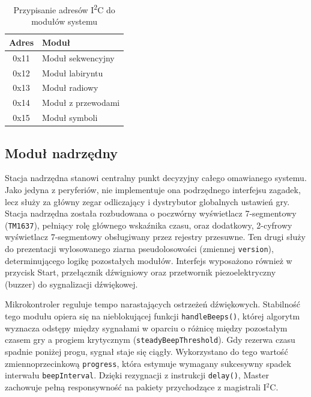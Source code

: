 \documentclass{SGGW-thesis}
\begin{document}
\begin{table}[H]
\centering
\caption{Przypisanie adresów I\textsuperscript{2}C do modułów systemu} \label{tab:module_i2c_addresses}
\begin{tabular}{|c|l|}
\hline
\textbf{Adres} & \textbf{Moduł} \\
\hline
0x11 & Moduł sekwencyjny \\
\hline
0x12 & Moduł labiryntu \\
\hline
0x13 & Moduł radiowy \\
\hline
0x14 & Moduł z przewodami \\
\hline
0x15 & Moduł symboli \\
\hline
\end{tabular}
\end{table}

\subsection{Moduł nadrzędny}
Stacja nadrzędna stanowi centralny punkt decyzyjny całego omawianego systemu. Jako jedyna z peryferiów, nie implementuje ona podrzędnego interfejsu zagadek, lecz służy za główny zegar odliczający i dystrybutor globalnych ustawień gry. Stacja nadrzędna została rozbudowana o poczwórny wyświetlacz 7-segmentowy (\texttt{TM1637}), pełniący rolę głównego wskaźnika czasu, oraz dodatkowy, 2-cyfrowy wyświetlacz 7-segmentowy obsługiwany przez rejestry przesuwne. Ten drugi służy do prezentacji wylosowanego ziarna pseudolosowości (zmiennej \texttt{version}), determinującego logikę pozostałych modułów. Interfejs wyposażono również w przycisk Start, przełącznik dźwigniowy oraz przetwornik piezoelektryczny (buzzer) do sygnalizacji dźwiękowej.

Mikrokontroler reguluje tempo narastających ostrzeżeń dźwiękowych. Stabilność tego modułu opiera się na nieblokującej funkcji \texttt{handleBeeps()}, której algorytm wyznacza odstępy między sygnałami w oparciu o różnicę między pozostałym czasem gry a progiem krytycznym (\texttt{steadyBeepThreshold}). Gdy rezerwa czasu spadnie poniżej progu, sygnał staje się ciągły. Wykorzystano do tego wartość zmiennoprzecinkową \texttt{progress}, która estymuje wymagany sukcesywny spadek interwału \texttt{beepInterval}. Dzięki rezygnacji z instrukcji \texttt{delay()}, Master zachowuje pełną responsywność na pakiety przychodzące z magistrali I$^2$C.
\end{document}
